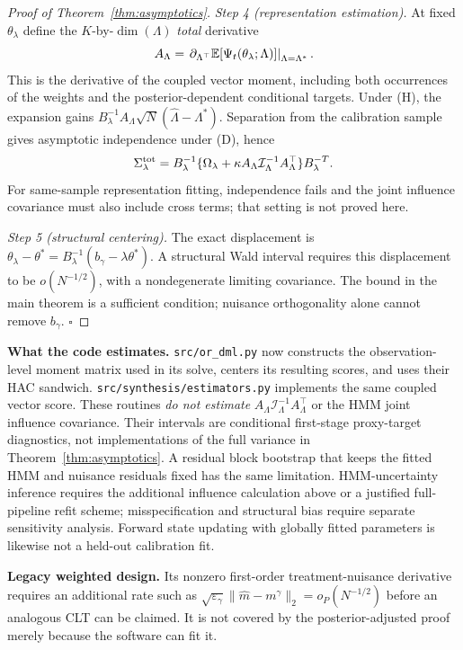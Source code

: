 \begin{proof}[Proof of Theorem~\ref{thm:asymptotics}]
\emph{Step 4 (representation estimation).} At fixed $\theta_\lambda$ define the $K$-by-$\dim(\Lambda)$ \emph{total} derivative
\[
A_\Lambda=\left.\partial_{\Lambda^\top}
\mathbb{E}[\Psi_t(\theta_\lambda;\Lambda)]\right|_{\Lambda=\Lambda^*}.
\]
This is the derivative of the coupled vector moment, including both occurrences of the weights and the posterior-dependent conditional targets. Under (H), the expansion gains $B_\lambda^{-1}A_\Lambda\sqrt N(\hat\Lambda-\Lambda^*)$. Separation from the calibration sample gives asymptotic independence under (D), hence
\[
\Sigma_\lambda^{\rm tot}
=B_\lambda^{-1}\{\Omega_\lambda+
\kappa A_\Lambda\mathcal I_\Lambda^{-1}A_\Lambda^\top\}B_\lambda^{-T}.
\]
For same-sample representation fitting, independence fails and the joint influence covariance must also include cross terms; that setting is not proved here.

\emph{Step 5 (structural centering).} The exact displacement is $\theta_\lambda-\theta^*=B_\lambda^{-1}(b_\gamma-\lambda\theta^*)$. A structural Wald interval requires this displacement to be $o(N^{-1/2})$, with a nondegenerate limiting covariance. The bound in the main theorem is a sufficient condition; nuisance orthogonality alone cannot remove $b_\gamma$. $\square$
\end{proof}

\textbf{What the code estimates.} \texttt{src/or\_dml.py} now constructs the observation-level moment matrix used in its solve, centers its resulting scores, and uses their HAC sandwich. \texttt{src/synthesis/estimators.py} implements the same coupled vector score. These routines \emph{do not estimate} $A_\Lambda\mathcal I_\Lambda^{-1}A_\Lambda^\top$ or the HMM joint influence covariance. Their intervals are conditional first-stage proxy-target diagnostics, not implementations of the full variance in Theorem~\ref{thm:asymptotics}. A residual block bootstrap that keeps the fitted HMM and nuisance residuals fixed has the same limitation. HMM-uncertainty inference requires the additional influence calculation above or a justified full-pipeline refit scheme; misspecification and structural bias require separate sensitivity analysis. Forward state updating with globally fitted parameters is likewise not a held-out calibration fit.

\textbf{Legacy weighted design.} Its nonzero first-order treatment-nuisance derivative requires an additional rate such as $\sqrt{\varepsilon_\gamma}\|\hat m-m^\gamma\|_2=o_P(N^{-1/2})$ before an analogous CLT can be claimed. It is not covered by the posterior-adjusted proof merely because the software can fit it.

